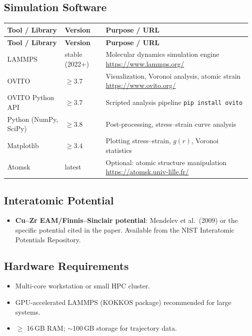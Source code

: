 \documentclass[11pt,a4paper]{article}
\begin{document}
\subsection{Simulation Software}
\begin{longtable}{p{4.5cm} p{2.5cm} p{6.5cm}}
\toprule
\textbf{Tool / Library} & \textbf{Version} & \textbf{Purpose / URL} \\
\midrule
\endfirsthead
\toprule
\textbf{Tool / Library} & \textbf{Version} & \textbf{Purpose / URL} \\
\midrule
\endhead
LAMMPS & stable (2022+) & Molecular dynamics simulation engine \newline \url{https://www.lammps.org/} \\
\midrule
OVITO & $\geq 3.7$ & Visualization, Voronoi analysis, atomic strain \newline \url{https://www.ovito.org/} \\
\midrule
OVITO Python API & $\geq 3.7$ & Scripted analysis pipeline \newline \texttt{pip install ovito} \\
\midrule
Python (NumPy, SciPy) & $\geq 3.8$ & Post-processing, stress--strain curve analysis \\
\midrule
Matplotlib & $\geq 3.4$ & Plotting stress--strain, $g(r)$, Voronoi statistics \\
\midrule
Atomsk & latest & Optional: atomic structure manipulation \newline \url{https://atomsk.univ-lille.fr/} \\
\bottomrule
\end{longtable}

\subsection{Interatomic Potential}
\begin{itemize}
  \item \textbf{Cu--Zr EAM/Finnis--Sinclair potential}: Mendelev et al.\ (2009) or the specific potential cited in the paper. Available from the NIST Interatomic Potentials Repository.
\end{itemize}

\subsection{Hardware Requirements}
\begin{itemize}
  \item Multi-core workstation or small HPC cluster.
  \item GPU-accelerated LAMMPS (KOKKOS package) recommended for large systems.
  \item $\geq$ 16\,GB RAM; $\sim$100\,GB storage for trajectory data.
\end{itemize}
\end{document}
